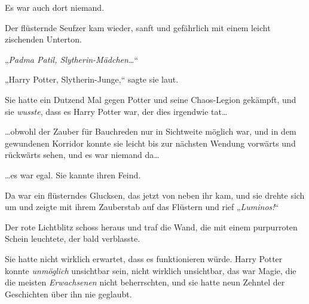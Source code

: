 Es war auch dort niemand.

Der flüsternde Seufzer kam wieder, sanft und gefährlich mit einem leicht zischenden Unterton.

„\emph{Padma Patil, Slytherin-Mädchen…}“

„Harry Potter, Slytherin-Junge,“ sagte sie laut.

Sie hatte ein Dutzend Mal gegen Potter und seine Chaos-Legion gekämpft, und sie \emph{wusste}, dass es Harry Potter war, der dies irgendwie tat…

…obwohl der Zauber für Bauchreden nur in Sichtweite möglich war, und in dem gewundenen Korridor konnte sie leicht bis zur nächsten Wendung vorwärts und rückwärts sehen, und es war niemand da…

…es war egal. Sie kannte ihren Feind.

Da war ein flüsterndes Glucksen, das jetzt von neben ihr kam, und sie drehte sich um und zeigte mit ihrem Zauberstab auf das Flüstern und rief „\emph{Luminos!}“

Der rote Lichtblitz schoss heraus und traf die Wand, die mit einem purpurroten Schein leuchtete, der bald verblasste.

Sie hatte nicht wirklich erwartet, dass es funktionieren würde. Harry Potter konnte \emph{unmöglich} unsichtbar sein, nicht wirklich unsichtbar, das war Magie, die die meisten \emph{Erwachsenen} nicht beherrschten, und sie hatte neun Zehntel der Geschichten über ihn nie geglaubt.

